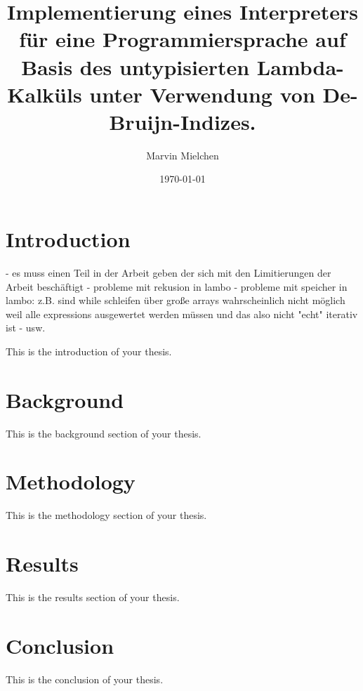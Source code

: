 \documentclass{article}
\title{Implementierung eines Interpreters für eine Programmiersprache auf Basis des untypisierten Lambda-Kalküls unter Verwendung von De-Bruijn-Indizes.}
\author{Marvin Mielchen}
\date{\today}
\begin{document}
\maketitle

\section{Introduction}



- es muss einen Teil in der Arbeit geben der sich mit den Limitierungen der Arbeit beschäftigt
    - probleme mit rekusion in lambo
    - probleme mit speicher in lambo: z.B. sind while schleifen über große arrays wahrscheinlich nicht möglich weil alle expressions ausgewertet werden müssen und
    das also nicht "echt" iterativ ist
    - usw.

    
This is the introduction of your thesis.

\section{Background}
This is the background section of your thesis.

\section{Methodology}
This is the methodology section of your thesis.

\section{Results}
This is the results section of your thesis.

\section{Conclusion}
This is the conclusion of your thesis.
\cite[S. 8]{nystrom}

\printbibliography
\end{document}
